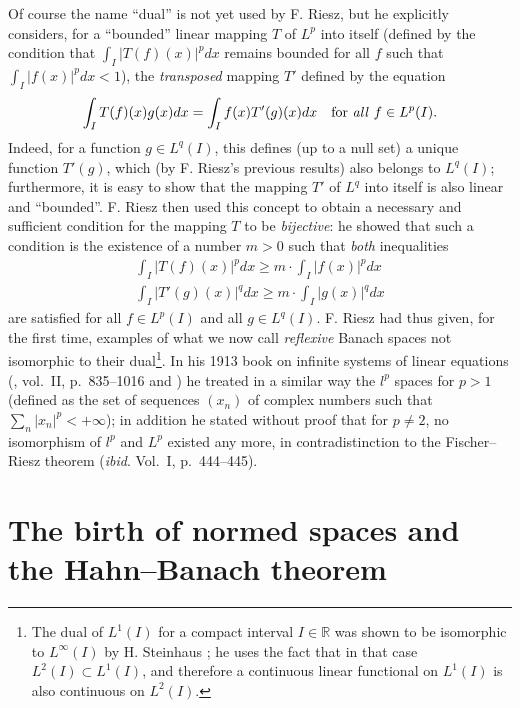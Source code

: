 \documentclass[12pt,a4paper,leqno,twoside]{extbook}
\newcommand{\R}{\mathbb{R}}
\begin{document}
Of course the name ``dual'' is not yet used by F. Riesz, but he explicitly considers, for a ``bounded'' linear mapping \(T\) of \(L^p\) into itself (defined by the condition that \(\int_I |T(f)(x)|^p dx\) remains bounded for all \(f\) such that \(\int_I |f(x)|^p dx < 1\)), the \emph{transposed} mapping \(T'\) defined by the equation
\begin{equation}
    \label{eq:6.10}
    \int_I T(f)(x)g(x)dx = \int_I f(x)T'(g)(x)dx \quad \text{for \emph{all} } f \in L^p(I).
\end{equation}
Indeed, for a function \(g \in L^q(I)\), this defines (up to a null set) a unique function \(T'(g)\), which (by F. Riesz's previous results) also belongs to \(L^q(I)\); furthermore, it is easy to show that the mapping \(T'\) of \(L^q\) into itself is also linear and ``bounded''. F. Riesz then used this concept to obtain a necessary and sufficient condition for the mapping \(T\) to be \emph{bijective}: he showed that such a condition is the existence of a number \(m > 0\) such that \emph{both} inequalities
\begin{equation}
    \label{eq:6.11}
    \begin{gathered}
    \int_I |T(f)(x)|^p dx \geq m \cdot \int_I |f(x)|^p dx \\
    \int_I |T'(g)(x)|^q dx \geq m \cdot \int_I |g(x)|^q dx
    \end{gathered}
\end{equation}
are satisfied for all \(f \in L^p(I)\) and all \(g \in L^q(I)\). F. Riesz had thus given, for the first time, examples of what we now call \emph{reflexive} Banach spaces not isomorphic to their dual\footnote{The dual of \(L^1(I)\) for a compact interval \(I \in \R\) was shown to be isomorphic to \(L^\infty(I)\) by H. Steinhaus \cite{202}; he uses the fact that in that case \(L^2(I) \subset L^1(I)\), and therefore a continuous linear functional on \(L^1(I)\) is also continuous on \(L^2(I)\).}. In his 1913 book on infinite systems of linear equations (\cite{183}, vol.~II, p.~835--1016 and \cite{184}) he treated in a similar way the \(l^p\) spaces for \(p > 1\) (defined as the set of sequences \((x_n)\) of complex numbers such that \(\sum\limits_n |x_n|^p < +\infty\)); in addition he stated without proof that for \(p \neq 2\), no isomorphism of \(l^p\) and \(L^p\) existed any more, in contradistinction to the Fischer--Riesz theorem (\emph{ibid}. Vol.~I, p.~444--445).

\section{The birth of normed spaces and the Hahn--Banach theorem}
\label{sec:6.3}
\end{document}
